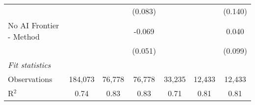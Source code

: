 \begin{tabular}{lcccccc}
                           &                &                & (0.083)        &                &               & (0.140)\\   
   No AI Frontier - Method &                &                & -0.069         &                &               & 0.040\\   
                           &                &                & (0.051)        &                &               & (0.099)\\   
   \midrule
   \emph{Fit statistics}\\
   Observations            & 184,073        & 76,778         & 76,778         & 33,235         & 12,433        & 12,433\\  
   R$^2$                   & 0.74           & 0.83           & 0.83           & 0.71           & 0.81          & 0.81\\  
   

\end{tabular}
